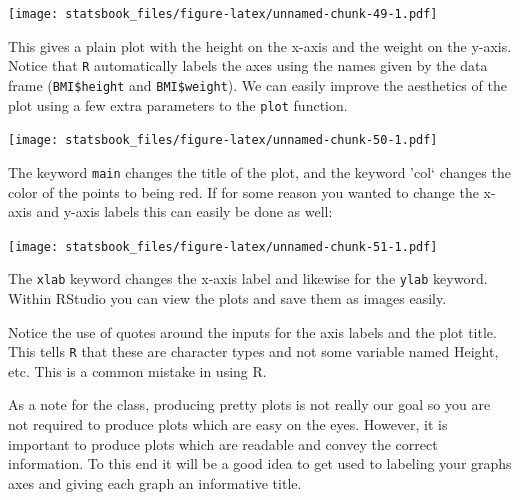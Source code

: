\documentclass[
]{book}
\newenvironment{Shaded}{\begin{snugshade}}{\end{snugshade}}
\newcommand{\AttributeTok}[1]{\textcolor[rgb]{0.77,0.63,0.00}{#1}}
\newcommand{\FunctionTok}[1]{\textcolor[rgb]{0.00,0.00,0.00}{#1}}
\newcommand{\NormalTok}[1]{#1}
\newcommand{\SpecialCharTok}[1]{\textcolor[rgb]{0.00,0.00,0.00}{#1}}
\newcommand{\StringTok}[1]{\textcolor[rgb]{0.31,0.60,0.02}{#1}}
\theoremstyle{definition}
\theoremstyle{definition}
\theoremstyle{definition}
\theoremstyle{definition}
\theoremstyle{remark}
\begin{document}
\texttt{[image: statsbook\_files/figure-latex/unnamed-chunk-49-1.pdf]}

This gives a plain plot with the height on the x-axis and the weight on the y-axis. Notice that \texttt{R} automatically labels the axes using the names given by the data frame (\texttt{BMI\$height} and \texttt{BMI\$weight}). We can easily improve the aesthetics of the plot using a few extra parameters to the \texttt{plot} function.

\begin{Shaded}
\end{Shaded}

\texttt{[image: statsbook\_files/figure-latex/unnamed-chunk-50-1.pdf]}

The keyword \texttt{main} changes the title of the plot, and the keyword 'col` changes the color of the points to being red. If for some reason you wanted to change the x-axis and y-axis labels this can easily be done as well:

\begin{Shaded}
\end{Shaded}

\texttt{[image: statsbook\_files/figure-latex/unnamed-chunk-51-1.pdf]}

The \texttt{xlab} keyword changes the x-axis label and likewise for the \texttt{ylab} keyword. Within RStudio you can view the plots and save them as images easily.

Notice the use of quotes around the inputs for the axis labels and the plot title. This tells \texttt{R} that these are character types and not some variable named Height, etc. This is a common mistake in using R.

As a note for the class, producing pretty plots is not really our goal so you are not required to produce plots which are easy on the eyes. However, it is important to produce plots which are readable and convey the correct information. To this end it will be a good idea to get used to labeling your graphs axes and giving each graph an informative title.
\end{document}
